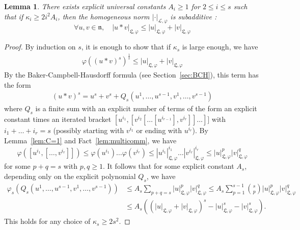 \documentclass[11pt,leqno]{article}
\theoremstyle{plain}
\newtheorem{lemma}[theorem]{Lemma}
\theoremstyle{definition}
\theoremstyle{remark}
\numberwithin{equation}{section}
\begin{document}
\begin{lemma}\label{lem:subadd}
There exists explicit universal constants $A_i\ge 1$ for $2\le i \le s$ such that if $\kappa_i\ge 2i^2A_i$, then the homogeneous norm $|\cdot|_{\mathcal{L},\varphi}$ is subadditive :
\[
\forall u,v \in \mathfrak{n}, \quad |u\ast v|_{\mathfrak{L},\varphi} \le |u|_{\mathfrak{L},\varphi}+|v|_{\mathfrak{L},\varphi}
\]
\end{lemma}

\begin{proof} By induction on $s$,
it is enough to show that if $\kappa_s$ is large enough, we have
\begin{align}\label{eq:pt2}
\varphi\left((u\ast v)^s\right)^{\frac{1}{s}} \le |u|_{\mathfrak{L},\varphi}+|v|_{\mathfrak{L},\varphi}
\end{align}
By the Baker-Campbell-Hausdorff formula (see Section~\ref{sec:BCH}), this term has the form
\begin{align}\label{eq:ws}
(u\ast v)^s=u^s+v^s+Q_s(u^1,\dots,u^{s-1},v^1,\dots,v^{s-1})
\end{align}
where $Q_s$ is a finite sum with an explicit number of terms of the form an explicit constant times an iterated bracket $[u^{i_1},[v^{i_2}[\dots[u^{i_{r-1}}],v^{i_r}]]\dots]]$ with $i_1+\dots+i_r=s$ (possibly starting with $v^{i_1}$ or ending with $u^{i_r}$). By Lemma~\ref{lem:C=1} and Fact~\ref{lem:multicomm}, we have
\[
\varphi\left([u^{i_1},[\dots,v^{i_r}]] \right)\le \varphi(u^{i_1})\dots \varphi(v^{i_r}) \le |u^{i_1}|_{\mathfrak{L},\varphi}^{i_1}\dots|v^{i_r}|_{\mathfrak{L},\varphi}^{i_r}\le |u|_{\mathfrak{L},\varphi}^p|v|_{\mathfrak{L},\varphi}^q
\]
for some $p+q=s$ with $p,q\ge 1$.  %
 It follows that for some explicit constant $A_s$, depending only on the explicit polynomial $Q_s$, we have
\begin{align*}
\varphi_s\left(Q_s(u^1,\dots,u^{s-1},v^1,\dots,v^{s-1})\right)&\le A_s\sum_{p+q=s}|u|_{\mathfrak{L},\varphi}^p|v|_{\mathfrak{L},\varphi}^q \le A_s\sum_{p=1}^{s-1} {s\choose p}|u|_{\mathfrak{L},\varphi}^p|v|_{\mathfrak{L},\varphi}^q \\  &\le A_s\left((|u|_{\mathfrak{L},\varphi}+|v|_{\mathfrak{L},\varphi})^s-|u|_{\mathfrak{L},\varphi}^s-|v|_{\mathfrak{L},\varphi}^s \right).
\end{align*}
This holds for any choice of $\kappa_s\ge 2s^2$.

\end{proof}
\end{document}
